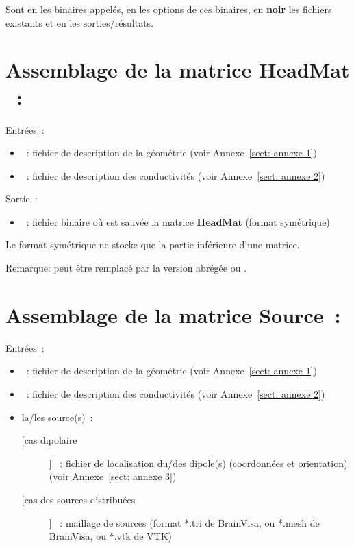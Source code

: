 \noindent
Sont en  les binaires appelés, en  les options de ces binaires, en \textbf{noir}
les fichiers existants et en  les sorties/résultats. 

\section{Assemblage de la matrice $\mathbf{HeadMat}$~:}
\label{sect: command assemble HeadMat}

\noindent
Entrées~: 
\begin{itemize}
    \item {}~: fichier de description de la géométrie (voir Annexe~\ref{sect: annexe 1})
    \item {}~: fichier de description des conductivités (voir Annexe~\ref{sect: annexe 2})
\end{itemize}

\noindent
Sortie~:
\begin{itemize}
    \item {}~: fichier binaire où est sauvée la matrice $\mathbf{HeadMat}$ (format symétrique)
\end{itemize}
Le format symétrique ne stocke que la partie inférieure d'une matrice.
\medskip

\noindent
{}
\medskip
Remarque:  peut être remplacé par la version abrégée  ou .

\section{Assemblage de la matrice $\mathbf{Source}$~:}
\label{sect: command assemble SourceMat}

\noindent
Entrées~: 
\begin{itemize}
    \item {}~: fichier de description de la géométrie (voir Annexe~\ref{sect: annexe 1})
    \item {}~: fichier de description des conductivités (voir Annexe~\ref{sect: annexe 2})
    \item la/les source(s)~:
        \begin{description}
            \item [[cas dipolaire]] ~: fichier de localisation du/des dipole(s) (coordonnées et orientation)
                                    (voir Annexe~\ref{sect: annexe 3}) 
            \item [[cas des sources distribuées]]  ~: maillage de sources (format *.tri de BrainVisa, ou *.mesh de BrainVisa, ou *.vtk de VTK) 
        \end{description}
\end{itemize}

